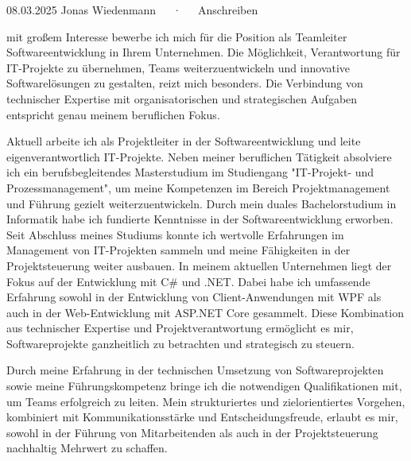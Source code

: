 \documentclass[11pt, a4paper]{awesome-cv}
\begin{document}
\makecvheader[R]

\makecvfooter
  {08.03.2025}
  {Jonas Wiedenmann~~~·~~~Anschreiben}
  {}

\makelettertitle

\begin{cvletter}

  mit großem Interesse bewerbe ich mich für die Position als Teamleiter Softwareentwicklung in Ihrem Unternehmen. Die Möglichkeit, Verantwortung für IT-Projekte zu übernehmen, Teams weiterzuentwickeln und innovative Softwarelösungen zu gestalten, reizt mich besonders. Die Verbindung von technischer Expertise mit organisatorischen und strategischen Aufgaben entspricht genau meinem beruflichen Fokus.
  
  Aktuell arbeite ich als Projektleiter in der Softwareentwicklung und leite eigenverantwortlich IT-Projekte. Neben meiner beruflichen Tätigkeit absolviere ich ein berufsbegleitendes Masterstudium im Studiengang "IT-Projekt- und Prozessmanagement", um meine Kompetenzen im Bereich Projektmanagement und Führung gezielt weiterzuentwickeln. Durch mein duales Bachelorstudium in Informatik habe ich fundierte Kenntnisse in der Softwareentwicklung erworben. Seit Abschluss meines Studiums konnte ich wertvolle Erfahrungen im Management von IT-Projekten sammeln und meine Fähigkeiten in der Projektsteuerung weiter ausbauen. In meinem aktuellen Unternehmen liegt der Fokus auf der Entwicklung mit C\# und .NET. Dabei habe ich umfassende Erfahrung sowohl in der Entwicklung von Client-Anwendungen mit WPF als auch in der Web-Entwicklung mit ASP.NET Core gesammelt. Diese Kombination aus technischer Expertise und Projektverantwortung ermöglicht es mir, Softwareprojekte ganzheitlich zu betrachten und strategisch zu steuern.
  
  Durch meine Erfahrung in der technischen Umsetzung von Softwareprojekten sowie meine Führungskompetenz bringe ich die notwendigen Qualifikationen mit, um Teams erfolgreich zu leiten. Mein strukturiertes und zielorientiertes Vorgehen, kombiniert mit Kommunikationsstärke und Entscheidungsfreude, erlaubt es mir, sowohl in der Führung von Mitarbeitenden als auch in der Projektsteuerung nachhaltig Mehrwert zu schaffen.
  

\end{cvletter}
\end{document}
